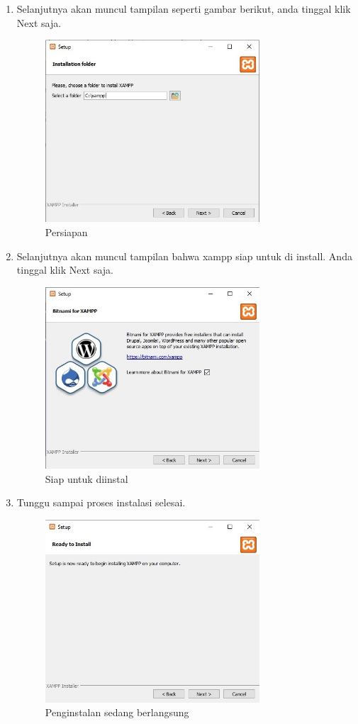 \begin{enumerate}
\item Selanjutnya akan muncul tampilan seperti gambar berikut, anda tinggal klik Next saja.
	\begin{figure}[H]
		\includegraphics[width=8cm]{figures/instalasi/xampp5.jpg}
		\centering
		\caption{Persiapan}
	\end{figure}
	
\item Selanjutnya akan muncul tampilan bahwa xampp siap untuk di install. Anda tinggal klik Next saja.
	\begin{figure}[H]
		\includegraphics[width=8cm]{figures/instalasi/xampp6.jpg}
		\centering
		\caption{Siap untuk diinstal}
	\end{figure}

\item Tunggu sampai proses instalasi selesai.
	\begin{figure}[H]
		\includegraphics[width=8cm]{figures/instalasi/xampp7.jpg}
		\centering
		\caption{Penginstalan sedang berlangsung}
	\end{figure}
\end{enumerate}

